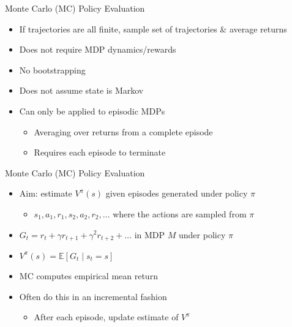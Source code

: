 \begin{frame}[c]{Monte Carlo (MC) Policy Evaluation}

\begin{itemize}
	\item If trajectories are all finite, sample set of trajectories \& average returns
	\item Does \alert{not} require MDP dynamics/rewards
	\item No bootstrapping
	\item Does not assume state is Markov
	\item Can only be applied to episodic MDPs
	\begin{itemize}
		\item Averaging over returns from a complete episode
		\item Requires each episode to terminate
	\end{itemize}
\end{itemize}

\end{frame}
\begin{frame}[c]{Monte Carlo (MC) Policy Evaluation}

\begin{itemize}
	\item Aim: estimate $V^\pi (s)$ given episodes generated under policy $\pi$
	\begin{itemize}
		\item $s_1, a_1, r_1, s_2, a_2, r_2, \ldots$ where the actions are sampled from $\pi$
	\end{itemize}
	\item $G_t = r_t + \gamma r_{t+1} + \gamma^2 r_{t+2} + \ldots$ in MDP $M$ under policy $\pi$
	\item $V^\pi (s) = \mathbb{E} [G_t \mid s_t = s]$
	\item MC computes empirical mean return
	\item Often do this in an incremental fashion
	\begin{itemize}
		\item After each episode, update estimate of $V^\pi$
	\end{itemize}
\end{itemize}

\end{frame}
